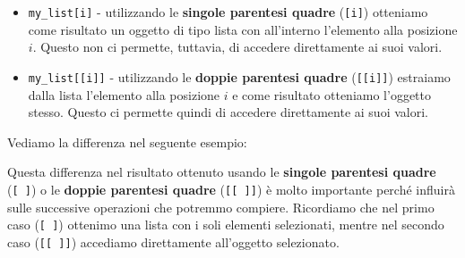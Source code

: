\documentclass[
]{book}
\newenvironment{Shaded}{\begin{snugshade}}{\end{snugshade}}
\newcommand{\CommentTok}[1]{\textcolor[rgb]{0.56,0.35,0.01}{\textit{#1}}}
\newcommand{\DecValTok}[1]{\textcolor[rgb]{0.00,0.00,0.81}{#1}}
\newcommand{\KeywordTok}[1]{\textcolor[rgb]{0.13,0.29,0.53}{\textbf{#1}}}
\newcommand{\NormalTok}[1]{#1}
\providecommand{\tightlist}{%
  \setlength{\itemsep}{0pt}\setlength{\parskip}{0pt}}
\begin{document}
\begin{itemize}
\tightlist
\item
  \texttt{my\_list{[}i{]}} - utilizzando le \textbf{singole parentesi quadre} (\texttt{{[}i{]}}) otteniamo come risultato un oggetto di tipo lista con all'interno l'elemento alla posizione \(i\). Questo non ci permette, tuttavia, di accedere direttamente ai suoi valori.
\item
  \texttt{my\_list{[}{[}i{]}{]}} - utilizzando le \textbf{doppie parentesi quadre} (\texttt{{[}{[}i{]}{]}}) estraiamo dalla lista l'elemento alla posizione \(i\) e come risultato otteniamo l'oggetto stesso. Questo ci permette quindi di accedere direttamente ai suoi valori.
\end{itemize}

Vediamo la differenza nel seguente esempio:

\begin{Shaded}
\end{Shaded}

Questa differenza nel risultato ottenuto usando le \textbf{singole parentesi quadre} (\texttt{{[}\ {]}}) o le \textbf{doppie parentesi quadre} (\texttt{{[}{[}\ {]}{]}}) è molto importante perché influirà sulle successive operazioni che potremmo compiere. Ricordiamo che nel primo caso (\texttt{{[}\ {]}}) ottenimo una lista con i soli elementi selezionati, mentre nel secondo caso (\texttt{{[}{[}\ {]}{]}}) accediamo direttamente all'oggetto selezionato.
\end{document}
